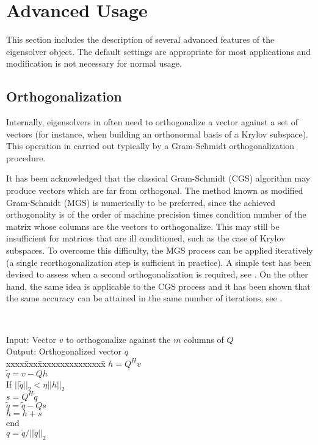 \section{Advanced Usage}

	This section includes the description of several advanced features of the eigensolver object. The default settings are appropriate for most applications and modification is not necessary for normal usage.

\subsection{Orthogonalization}
\label{sec:orthog}

	Internally, eigensolvers in  often need to orthogonalize a vector against a set of vectors (for instance, when building an orthonormal basis of a Krylov subspace). This operation in carried out typically by a Gram-Schmidt orthogonalization procedure.

	It has been acknowledged that the classical Gram-Schmidt (CGS) algorithm may produce vectors which are far from orthogonal. The method known as modified Gram-Schmidt (MGS) is numerically to be preferred, since the achieved orthogonality is of the order of machine precision times condition number of the matrix whose columns are the vectors to orthogonalize. This may still be insufficient for matrices that are ill conditioned, such as the case of Krylov subspaces. To overcome this difficulty, the MGS process can be applied iteratively (a single reorthogonalization step is sufficient in practice). A simple test has been devised to assess when a second orthogonalization is required, see \citep{Daniel:1976:RSA}. On the other hand, the same idea is applicable to the CGS process and it has been shown that the same accuracy can be attained in the same number of iterations, see \citep{Hoffmann:1989:IAG}.

\begin{algorithm}~\rm
\begin{tabbing}
Input: Vector $v$ to orthogonalize against the $m$ columns of $Q$ \\
Output: Orthogonalized vector $q$ \\
xxxx\=xxx\=xxxxxxxxxxxxxxx\=\kill
\> $h=Q^Hv$\\
\> $\tilde{q}=v-Qh$\\
\> If $||\tilde{q}||_2<\eta||h||_2$\\
\> \> $s=Q^H\tilde{q}$\\
\> \> $\tilde{q}=\tilde{q}-Qs$\\
\> \> $h=h+s$\\
\> end \\
\> $q=\tilde{q}/||\tilde{q}||_2$
\end{tabbing}
\end{algorithm}

